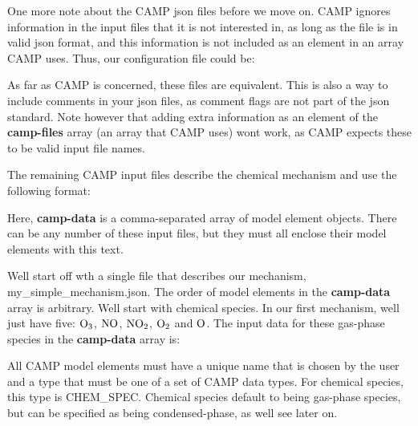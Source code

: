 One more note about the CAMP {\ttfamily json} files before we move on. CAMP ignores information in the input files that it is not interested in, as long as the file is in valid {\ttfamily json} format, and this information is not included as an element in an array CAMP uses. Thus, our configuration file could be\+: 
\begin{DoxyCode}{0}
\DoxyCodeLine{\{}
\DoxyCodeLine{\ \ \ :\ ,}
\DoxyCodeLine{\ \ \ :\ [}
\DoxyCodeLine{\ \ \ \ }
\DoxyCodeLine{\ \ ],}
\DoxyCodeLine{\ \ \ :\ [}
\DoxyCodeLine{\ \ \ \ ,}
\DoxyCodeLine{\ \ \ \ }
\DoxyCodeLine{\ \ ]}
\DoxyCodeLine{\}}

\end{DoxyCode}
 As far as CAMP is concerned, these files are equivalent. This is also a way to include comments in your {\ttfamily json} files, as comment flags are not part of the {\ttfamily json} standard. Note however that adding extra information as an element of the {\bfseries{camp-\/files}} array (an array that CAMP uses) won\textquotesingle{}t work, as CAMP expects these to be valid input file names.

The remaining CAMP input files describe the chemical mechanism and use the following format\+: 
\begin{DoxyCode}{0}
\DoxyCodeLine{\{}
\DoxyCodeLine{\ \ \ :\ [}
\DoxyCodeLine{}
\DoxyCodeLine{}
\DoxyCodeLine{\ \ ]}
\DoxyCodeLine{\}}

\end{DoxyCode}
 Here, {\bfseries{camp-\/data}} is a comma-\/separated array of model element objects. There can be any number of these input files, but they must all enclose their model elements with this text.

We\textquotesingle{}ll start off wth a single file that describes our mechanism, {\ttfamily my\+\_\+simple\+\_\+mechanism.\+json}. The order of model elements in the {\bfseries{camp-\/data}} array is arbitrary. We\textquotesingle{}ll start with chemical species. In our first mechanism, we\textquotesingle{}ll just have five\+: $\ce{O3}$, $\ce{NO}$, $\ce{NO2}$, $\ce{O2}$ and $\ce{O}$. The input data for these gas-\/phase species in the {\bfseries{camp-\/data}} array is\+: 
\begin{DoxyCode}{0}
\DoxyCodeLine{\{}
\DoxyCodeLine{\ \ \ :\ ,}
\DoxyCodeLine{\ \ \ :\ }
\DoxyCodeLine{\},}
\DoxyCodeLine{\{}
\DoxyCodeLine{\ \ \ :\ ,}
\DoxyCodeLine{\ \ \ :\ }
\DoxyCodeLine{\},}
\DoxyCodeLine{\{}
\DoxyCodeLine{\ \ \ :\ ,}
\DoxyCodeLine{\ \ \ :\ }
\DoxyCodeLine{\},}
\DoxyCodeLine{\{}
\DoxyCodeLine{\ \ \ :\ ,}
\DoxyCodeLine{\ \ \ :\ }
\DoxyCodeLine{\},}
\DoxyCodeLine{\{}
\DoxyCodeLine{\ \ \ :\ ,}
\DoxyCodeLine{\ \ \ :\ }
\DoxyCodeLine{\},}

\end{DoxyCode}
 All CAMP model elements must have a unique name that is chosen by the user and a type that must be one of a set of CAMP data types. For chemical species, this type is {\ttfamily CHEM\+\_\+\+SPEC}. Chemical species default to being gas-\/phase species, but can be specified as being condensed-\/phase, as we\textquotesingle{}ll see later on.


